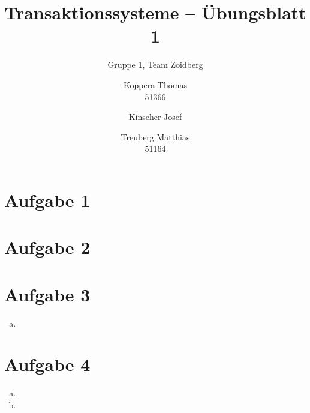 \documentclass{scrartcl}
\title{Transaktionssysteme -- Übungsblatt 1}
\subtitle{Gruppe 1, Team Zoidberg}
\author{Koppera Thomas \\ 51366
 \and Kinseher Josef \\ 
 \and Treuberg Matthias \\ 51164}
\date{ }
\begin{document}
  \maketitle
  
\section*{Aufgabe 1}

\section*{Aufgabe 2}


\section*{Aufgabe 3}

\begin{enumerate}[a)]
\item

\end{enumerate}

\section*{Aufgabe 4}
\begin{enumerate}[a)]
\item
\item
\end{enumerate}
\end{document}
